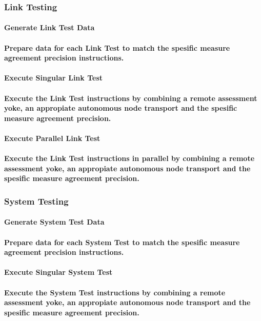 \documentclass{acm_proc_article-sp}
\begin{document}
\subsubsection{Link Testing}
\paragraph{Generate Link Test Data}
\paragraph{Prepare data for each Link Test to match the spesific measure agreement precision instructions.}
\paragraph{Execute Singular Link Test}
\paragraph{Execute the Link Test instructions by combining a remote assessment yoke, an appropiate autonomous node transport and the spesific measure agreement precision.}
\paragraph{Execute Parallel Link Test}
\paragraph{Execute the Link Test instructions in parallel by combining a remote assessment yoke, an appropiate autonomous node transport and the spesific measure agreement precision.}
\subsubsection{System Testing}
\paragraph{Generate System Test Data}
\paragraph{Prepare data for each System Test to match the spesific measure agreement precision instructions.}
\paragraph{Execute Singular System Test}
\paragraph{Execute the System Test instructions by combining a remote assessment yoke, an appropiate autonomous node transport and the spesific measure agreement precision.}
\end{document}
